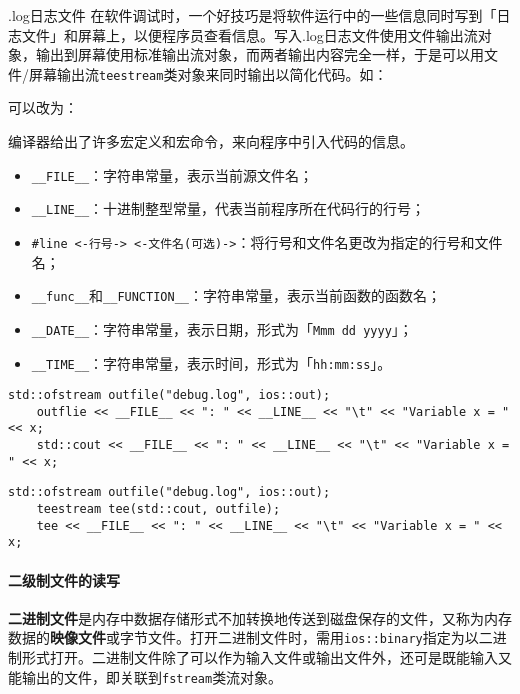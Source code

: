 \documentclass[10pt, a4paper, oneside, fontset=none]{ctexart}
\theoremstyle{plain}
\theoremstyle{definition}
\newcommand{\zhu}[2][]{\begin{note}{#1}\xiu #2\end{note}}
\begin{document}
\zhu[.log日志文件]{
	在软件调试时，一个好技巧是将软件运行中的一些信息同时写到「日志文件」和屏幕上，以便程序员查看信息。写入.log日志文件使用文件输出流对象，输出到屏幕使用标准输出流对象，而两者输出内容完全一样，于是可以用文件/屏幕输出流\texttt{teestream}类对象来同时输出以简化代码。如：
	\vspace{3.8\baselineskip}

	可以改为：
	\vspace{4\baselineskip}

	编译器给出了许多宏定义和宏命令，来向程序中引入代码的信息。
	\begin{itemize}[leftmargin=1em]
		\item \texttt{\_\_FILE\_\_}：字符串常量，表示当前源文件名；
		\item \texttt{\_\_LINE\_\_}：十进制整型常量，代表当前程序所在代码行的行号；
		\item \texttt{\#line}\ \lstinline[style=notec]|<-行号->|\ \lstinline[style=notec]|<-文件名(可选)->|：将行号和文件名更改为指定的行号和文件名；
		\item \texttt{\_\_func\_\_}和\texttt{\_\_FUNCTION\_\_}：字符串常量，表示当前函数的函数名；
		\item \texttt{\_\_DATE\_\_}：字符串常量，表示日期，形式为「\texttt{Mmm dd yyyy}」；
		\item \texttt{\_\_TIME\_\_}：字符串常量，表示时间，形式为「\texttt{hh:mm:ss}」。
	\end{itemize}
}
\vspace{-17\baselineskip}
\begin{lstlisting}[style=notec]
	std::ofstream outfile("debug.log", ios::out);
	outflie << __FILE__ << ": " << __LINE__ << "\t" << "Variable x = " << x;
	std::cout << __FILE__ << ": " << __LINE__ << "\t" << "Variable x = " << x;
\end{lstlisting}
\vspace{0.8\baselineskip}
\begin{lstlisting}[style=notec]
	std::ofstream outfile("debug.log", ios::out);
	teestream tee(std::cout, outfile);
	tee << __FILE__ << ": " << __LINE__ << "\t" << "Variable x = " << x;
\end{lstlisting}
\vspace{8\baselineskip}

\paragraph{二级制文件的读写}

\textbf{二进制文件}是内存中数据存储形式不加转换地传送到磁盘保存的文件，又称为内存数据的\textbf{映像文件}或字节文件。打开二进制文件时，需用\texttt{ios::binary}指定为以二进制形式打开。二进制文件除了可以作为输入文件或输出文件外，还可是既能输入又能输出的文件，即关联到\texttt{fstream}类流对象。
\end{document}
